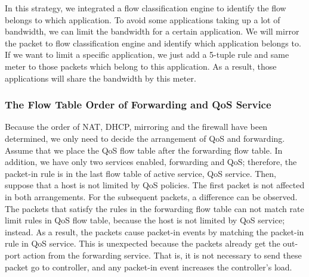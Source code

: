 \documentclass[conference]{IEEEtran}
\begin{document}
In this strategy, we integrated a flow classification engine to identify the flow belongs to which application.
To avoid some applications taking up a lot of bandwidth, we can limit the bandwidth for a certain application.
We will mirror the packet to flow classification engine and identify which application belongs to.
If we want to limit a specific application, we just add a 5-tuple rule and same meter to those packets which belong to this application.
As a result, those applications will share the bandwidth by this meter.
%
%
%

\subsubsection{The Flow Table Order of Forwarding and QoS Service}
Because the order of NAT, DHCP, mirroring and the firewall have been determined, we only need to decide the arrangement of QoS and forwarding. Assume that we place the QoS flow table after the forwarding flow table. In addition, we have only two services enabled, forwarding and QoS; therefore, the packet-in rule is in the last flow table of active service, QoS service. Then, suppose that a host is not limited by QoS policies. The first packet is not affected in both arrangements. For the subsequent packets, a difference can be observed. The packets that satisfy the rules in the forwarding flow table can not match rate limit rules in QoS flow table, because the host is not limited by QoS service; instead. As a result, the packets cause packet-in events by matching the packet-in rule in QoS service. This is unexpected because the packets already get the out-port action from the forwarding service. That is, it is not necessary to send these packet go to controller, and any packet-in event increases the controller’s load.
\end{document}

